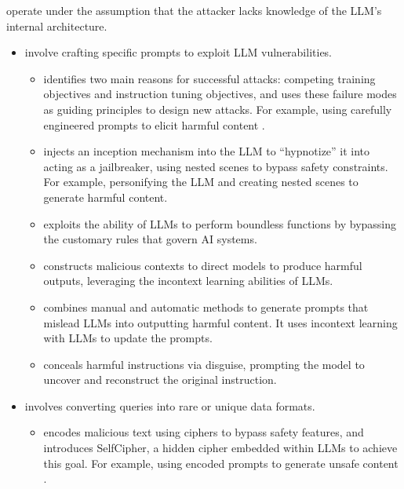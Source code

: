 \documentclass[letterpaper,11pt,english]{sphinxmanual}
\begin{document}
\sphinxAtStartPar
{} operate under the assumption that the
attacker lacks knowledge of the LLM’s internal architecture.
\begin{itemize}
\item {} 
\sphinxAtStartPar
{} involve crafting specific prompts
to exploit LLM vulnerabilities.
\begin{itemize}
\item {} 
\sphinxAtStartPar
{} identifies two main reasons for successful attacks:
competing training objectives and instruction tuning objectives, and
uses these failure modes as guiding principles to design new
attacks. For example, using carefully engineered prompts to elicit
harmful content .

\item {} 
\sphinxAtStartPar
{} injects an inception mechanism into the LLM to
“hypnotize” it into acting as a jailbreaker, using nested scenes to
bypass safety constraints. For example, personifying the LLM and
creating nested scenes to generate harmful content.

\item {} 
\sphinxAtStartPar
{} exploits the ability of LLMs to perform
boundless functions by bypassing the customary rules that govern AI
systems.

\item {} 
\sphinxAtStartPar
{} constructs malicious contexts to direct
models to produce harmful outputs, leveraging the in\sphinxhyphen{}context
learning abilities of LLMs.

\item {} 
\sphinxAtStartPar
{} combines manual and automatic
methods to generate prompts that mislead LLMs into outputting
harmful content. It uses in\sphinxhyphen{}context learning with LLMs to update the
prompts.

\item {} 
\sphinxAtStartPar
{} conceals harmful
instructions via disguise, prompting the model to uncover and
reconstruct the original instruction.

\end{itemize}

\item {} 
\sphinxAtStartPar
{} involves converting queries into
rare or unique data formats.
\begin{itemize}
\item {} 
\sphinxAtStartPar
{} encodes malicious text using ciphers to bypass safety
features, and introduces SelfCipher, a hidden cipher embedded within
LLMs to achieve this goal. For example, using encoded prompts to
generate unsafe content .


\end{itemize}
\end{itemize}
\end{document}
